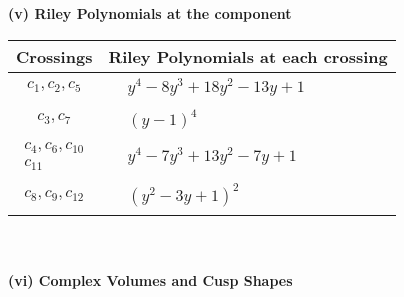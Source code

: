 \documentclass[1p]{elsarticle_modified}
\theoremstyle{definition}
\begin{document}
\newpage\renewcommand{\arraystretch}{1}
\flushleft \textbf{(v) Riley Polynomials at the component}\newline \\
\begin{tabular}{m{50pt}|m{274pt}}
Crossings & \hspace{64pt}Riley Polynomials at each crossing \\
\hline $$\begin{aligned}c_{1},c_{2},c_{5}\end{aligned}$$&$\begin{aligned}
&y^4-8 y^3+18 y^2-13 y+1
\end{aligned}$\\
\hline $$\begin{aligned}c_{3},c_{7}\end{aligned}$$&$\begin{aligned}
&(y-1)^4
\end{aligned}$\\
\hline $$\begin{aligned}c_{4},c_{6},c_{10}\\c_{11}\end{aligned}$$&$\begin{aligned}
&y^4-7 y^3+13 y^2-7 y+1
\end{aligned}$\\
\hline $$\begin{aligned}c_{8},c_{9},c_{12}\end{aligned}$$&$\begin{aligned}
&(y^2-3 y+1)^2
\end{aligned}$\\
\hline
\end{tabular}\\~\\
\newpage\flushleft \textbf{(vi) Complex Volumes and Cusp Shapes}
\end{document}
